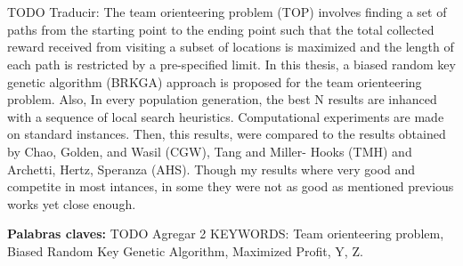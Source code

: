 \chapter*{\tituloAbstractEs}

\noindent TODO Traducir: The team orienteering problem (TOP) involves finding a set of paths from the starting point to the ending point such that the total collected reward received from visiting a subset of locations is maximized and the length of each path is restricted by a pre-specified limit. In this thesis, a biased random key genetic algorithm (BRKGA) approach is proposed for the team orienteering problem. Also, In every population generation, the best N results are inhanced with a sequence of local search heuristics. Computational experiments are made on standard instances. Then, this results, were compared to the results obtained by Chao, Golden, and Wasil (CGW), Tang and Miller-
Hooks (TMH) and Archetti, Hertz, Speranza (AHS). Though my results where very good and competite in most intances, in some they were not as good as mentioned previous works yet close enough.

\bigskip

\noindent\textbf{Palabras claves:} TODO Agregar 2 KEYWORDS: Team orienteering problem, Biased Random Key Genetic Algorithm, Maximized Profit, Y, Z.